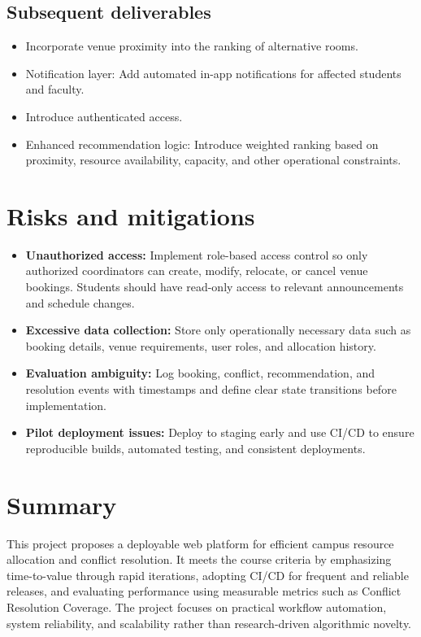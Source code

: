 \documentclass[11pt,a4paper]{article}
\begin{document}
\subsection{Subsequent deliverables}
\begin{itemize}[leftmargin=0.7cm]
    \item Incorporate venue proximity into the ranking of alternative rooms.
    \item Notification layer: Add automated in-app notifications for affected students and faculty.
    \item Introduce authenticated access.
    \item Enhanced recommendation logic: Introduce weighted ranking based on proximity, resource availability, capacity, and other operational constraints.
\end{itemize}
\section{Risks and mitigations}
\begin{itemize}[leftmargin=0.7cm]
    \item \textbf{Unauthorized access:} Implement role-based access control so only authorized coordinators can create, modify, relocate, or cancel venue bookings. Students should have read-only access to relevant announcements and schedule changes.
    \item \textbf{Excessive data collection:} Store only operationally necessary data such as booking details, venue requirements, user roles, and allocation history.
    \item \textbf{Evaluation ambiguity:} Log booking, conflict, recommendation, and resolution events with timestamps and define clear state transitions before implementation.
    \item \textbf{Pilot deployment issues:} Deploy to staging early and use CI/CD to ensure reproducible builds, automated testing, and consistent deployments.
\end{itemize}

\section{Summary}
This project proposes a deployable web platform for efficient campus resource allocation and conflict resolution. It meets the course criteria by emphasizing time-to-value through rapid iterations, adopting CI/CD for frequent and reliable releases, and evaluating performance using measurable metrics such as Conflict Resolution Coverage. The project focuses on practical workflow automation, system reliability, and scalability rather than research-driven algorithmic novelty.
\end{document}
